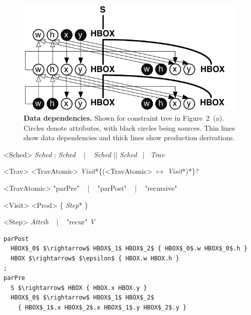 \begin{figure}
\centering
\includegraphics[trim=0 0 0 0,clip,width=0.8\columnwidth]{chapter3/deps}
\caption{\textbf{Data dependencies.} Shown for constraint tree  in Figure~2~(a). Circles denote attributes, with black circles being  sources. Thin lines show data dependencies and thick lines show production derivations.}
\label{fig:deps}
\end{figure}


\newsavebox{\decomplang}
\begin{lrbox}{\decomplang}%
\begin{minipage}{1\columnwidth}
\renewcommand{\litleft}{\bfseries}
\renewcommand{\ulitleft}{\bfseries}
\renewcommand{\superscript}[1]{\ensuremath{^{\textrm{#1}}}}
\renewcommand{\subscript}[1]{\ensuremath{_{\textrm{\uppercase{#1}}}}}
\renewcommand{\syntleft}{\normalfont\itshape}
\renewcommand{\syntright}{}
\begin{grammar}
<Sched> \deriv{} \emph{Sched} ; \emph{Sched}  ~ | ~ \emph{Sched} $\vert\vert$ \emph{Sched}  ~|~ \emph{Trav}

<Trav> \deriv{} <TravAtomic> \emph{Visit}*\{(<TravAtomic> $\mapsto$ \emph{Visit}*)*\}?

<TravAtomic>  \deriv{} "parPre"  ~ | ~  "parPost"  ~ | ~  "recursive" ~ 

<Visit> \deriv{} <Prod>  \{ \emph{Step}* \}

<Step> \deriv{} \emph{Attrib} ~ | ~ "recur" \emph{V} 
\end{grammar}
\end{minipage}
\end{lrbox}


\newsavebox{\hboxdecomp}
\begin{lrbox}{\hboxdecomp}%
\begin{minipage}{1\columnwidth}
\begin{lstlisting}[mathescape,morekeywords={parPre,parPost}]
parPost
  HBOX$_0$ $\rightarrow$ HBOX$_1$ HBOX$_2$ { HBOX$_0$.w HBOX$_0$.h }
  HBOX $\rightarrow$ $\epsilon$ { HBOX.w HBOX.h }
;
parPre
  S $\rightarrow$ HBOX { HBOX.x HBOX.y }
  HBOX$_0$ $\rightarrow$ HBOX$_1$ HBOX$_2$ 
    { HBOX$_1$.x HBOX$_2$.x HBOX$_1$.y HBOX$_2$.y }
\end{lstlisting}
\end{minipage}
\end{lrbox}

